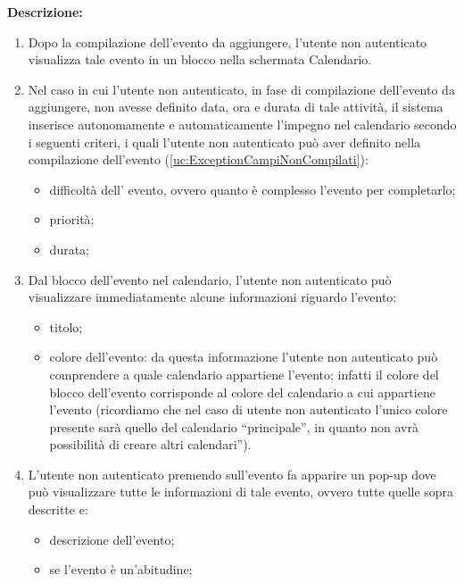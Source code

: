 \begin{listaPersonale}[UC]{}
\begin{listaPersonale2} [UC] {}
    \textbf{Descrizione: }
    \begin{enumerate}
        \item Dopo la compilazione dell'evento da aggiungere, l'utente non autenticato visualizza tale evento in un blocco nella schermata Calendario.
        \item Nel caso in cui l'utente non autenticato, in fase di compilazione dell'evento da aggiungere, non avesse definito data, ora e durata di tale attività, il sistema inserisce autonomamente e automaticamente l'impegno nel calendario secondo i seguenti criteri, i quali l'utente non autenticato può aver definito nella compilazione dell'evento (\ref{uc:ExceptionCampiNonCompilati}):
              \begin{itemize}
                  \item difficoltà dell' evento, ovvero quanto è complesso l'evento per completarlo;
                  \item priorità;
                  \item durata;
              \end{itemize}
        \item Dal blocco dell'evento nel calendario, l'utente non autenticato può visualizzare immediatamente alcune informazioni riguardo l'evento:
              \begin{itemize}
                  \item titolo;
                  \item colore dell'evento: da questa informazione l'utente non autenticato può comprendere a quale calendario appartiene l'evento; infatti il colore del blocco dell'evento corrisponde al colore del calendario a cui appartiene l'evento (ricordiamo che nel caso di utente non autenticato l'unico colore presente sarà quello del calendario “principale”, in quanto non avrà possibilità di creare altri calendari”).
              \end{itemize}

        \item L'utente non autenticato premendo sull'evento fa apparire un pop-up dove può visualizzare tutte le informazioni di tale evento, ovvero tutte quelle sopra descritte e:
              \begin{itemize}
                  \item descrizione dell'evento;
                  \item se l'evento è un'abitudine;

\end{itemize}
\end{enumerate}
\end{listaPersonale2}
\end{listaPersonale}
